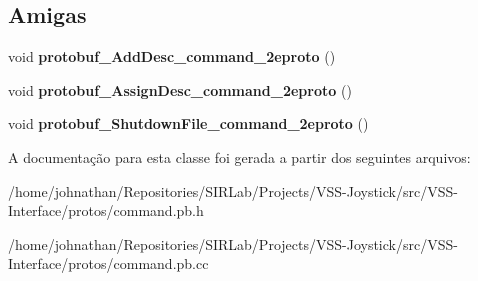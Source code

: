 \subsection*{Amigas}
\begin{DoxyCompactItemize}
\item 
void {\bfseries protobuf\+\_\+\+Add\+Desc\+\_\+command\+\_\+2eproto} ()\hypertarget{classvss__command_1_1Robot__Command_a4825d92f856fcb4b02c67b601c433796}{}\label{classvss__command_1_1Robot__Command_a4825d92f856fcb4b02c67b601c433796}

\item 
void {\bfseries protobuf\+\_\+\+Assign\+Desc\+\_\+command\+\_\+2eproto} ()\hypertarget{classvss__command_1_1Robot__Command_a4c6fb97c25079d49daf010087d869100}{}\label{classvss__command_1_1Robot__Command_a4c6fb97c25079d49daf010087d869100}

\item 
void {\bfseries protobuf\+\_\+\+Shutdown\+File\+\_\+command\+\_\+2eproto} ()\hypertarget{classvss__command_1_1Robot__Command_a4cf10633ad46690f5eec6bdbbcf62de0}{}\label{classvss__command_1_1Robot__Command_a4cf10633ad46690f5eec6bdbbcf62de0}

\end{DoxyCompactItemize}


A documentação para esta classe foi gerada a partir dos seguintes arquivos\+:\begin{DoxyCompactItemize}
\item 
/home/johnathan/\+Repositories/\+S\+I\+R\+Lab/\+Projects/\+V\+S\+S-\/\+Joystick/src/\+V\+S\+S-\/\+Interface/protos/command.\+pb.\+h\item 
/home/johnathan/\+Repositories/\+S\+I\+R\+Lab/\+Projects/\+V\+S\+S-\/\+Joystick/src/\+V\+S\+S-\/\+Interface/protos/command.\+pb.\+cc\end{DoxyCompactItemize}
